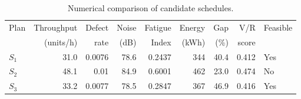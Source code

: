 \begin{table}[htbp]
\centering
\caption{Numerical comparison of candidate schedules.}
\label{tab:numerical-sim}
\small
\begin{tabular}{@{}lrrrrrrrl@{}}
\toprule
Plan & Throughput & Defect & Noise & Fatigue & Energy & Gap & V/R & Feasible \\
     & (units/h)  & rate   & (dB)  & Index   & (kWh)  & (\%) & score &         \\
\midrule
$S_{1}$ & 31.0 & 0.0076 & 78.6 & 0.2437 & 344 & 40.4 & 0.412 & Yes \\
$S_{2}$ & 48.1 & 0.01 & 84.9 & 0.6001 & 462 & 23.0 & 0.474 & No \\
$S_{3}$ & 33.2 & 0.0077 & 78.5 & 0.2847 & 367 & 46.9 & 0.416 & Yes \\
\bottomrule
\end{tabular}
\end{table}
